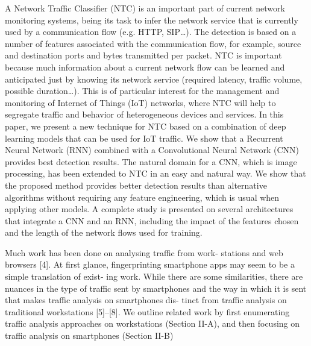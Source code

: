 \documentclass[10pt,journal,compsoc]{IEEEtran}
\begin{document}
  \cite{Lopez-Martin2017}
A Network Traffic Classifier (NTC) is an important
part of current network monitoring systems, being its task to infer the network service that is currently used by a communication flow (e.g. HTTP, SIP…). The detection is based on a number of features associated with the communication flow, for example, source and destination ports and bytes transmitted per packet. NTC is important because much information about a current network flow can be learned and anticipated just by knowing its network service (required latency, traffic volume, possible duration…). This is of particular interest for the management and monitoring of Internet of Things (IoT) networks, where NTC will help to segregate traffic and behavior of heterogeneous devices and services. In this paper, we present a new technique for NTC based on a combination of deep learning models that can be used for IoT traffic. We show that a Recurrent Neural Network (RNN) combined with a Convolutional Neural Network (CNN) provides best detection results. The natural domain for a CNN, which is image processing, has been extended to NTC in an easy and natural way. We show that the proposed method provides better detection results than alternative algorithms without requiring any feature engineering, which is usual when applying other models. A complete study is presented on several architectures that integrate a CNN and an RNN, including the impact of the features chosen and the length of the network flows used for training.

\cite{Taylor2018}
Much work has been done on analysing traffic from work-
stations and web browsers [4]. At first glance, fingerprinting smartphone apps may seem to be a simple translation of exist- ing work. While there are some similarities, there are nuances in the type of traffic sent by smartphones and the way in which it is sent that makes traffic analysis on smartphones dis- tinct from traffic analysis on traditional workstations [5]–[8]. We outline related work by first enumerating traffic analysis approaches on workstations (Section II-A), and then focusing on traffic analysis on smartphones (Section II-B)

\cite{Anderson2017}
\end{document}
